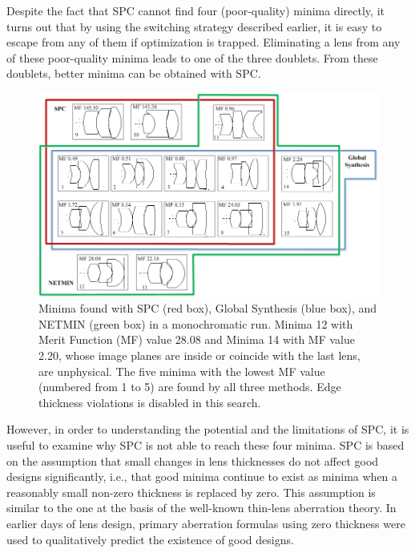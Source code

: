 Despite the fact that SPC cannot find four (poor-quality) minima directly, it turns out that by using the switching strategy described earlier, it is easy to escape from any of them if optimization is trapped. Eliminating a lens from any of these poor-quality minima leads to one of the three doublets. From these doublets, better minima can be obtained with SPC.
\begin{figure}[h!]
    \centering
    \includegraphics[width=1.0\textwidth]{chapter-3/figures/TripletMoNoNetwork.png}
    \caption{Minima found with SPC (red box), Global Synthesis (blue box), and NETMIN (green box) in a monochromatic run. Minima 12 with Merit Function (MF) value 28.08 and Minima 14 with MF value 2.20, whose image planes are inside or coincide with the last lens, are unphysical. The five minima with the lowest MF value (numbered from 1 to 5) are found by all three methods. Edge thickness violations is disabled in this search.}
    \label{fig:TripletMonoNetwork}
\end{figure}

However, in order to understanding the potential and the limitations of SPC, it is useful to examine why SPC is not able to reach these four minima. SPC is based on the assumption that small changes in lens thicknesses do not affect good designs significantly, i.e., that good minima continue to exist as minima when a reasonably small non-zero thickness is replaced by zero. This assumption is similar to the one at the basis of the well-known thin-lens aberration theory. In earlier days of lens design, primary aberration formulas using zero thickness were used to qualitatively predict the existence of good designs.

